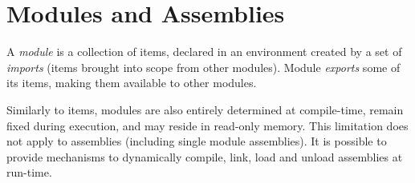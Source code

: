 \chapter{Modules and Assemblies}

A \emph{module} is a collection of items, declared in an environment created by a set of \emph{imports} (items brought into scope from other modules). Module \emph{exports} some of its items, making them available to other modules.

Similarly to items, modules are also entirely determined at compile-time, remain fixed during execution, and may reside in read-only memory. This limitation does not apply to assemblies (including single module assemblies). It is possible to provide mechanisms to dynamically compile, link, load and unload assemblies at run-time.
